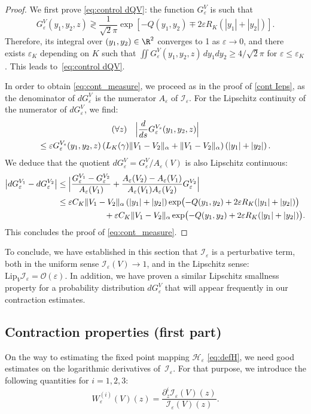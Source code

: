 \documentclass[JEP,XML,SOM,Unicode]{cedram}
\let\mathcal\mathscr
\newcommand{\cI}{\mathcal{I}}
\newcommand{\cO}{\mathcal{O}}
\theoremstyle{plain}
\theoremstyle{definition}
\renewcommand{\H}{\mathcal{H}_\eps}
\let\eps\varepsilon
\newcommand{\abs}[1]{\left\lvert#1\right\rvert}
\newcommand{\Babs}[1]{\Bigl\lvert#1\Bigr\rvert}
\newcommand{\QV}{G_\eps^V}
\newcommand{\dQVA}{dG_\eps^{V_1}}
\newcommand{\dQVB}{dG_\eps^{V_2}}
\newcommand{\Cgamma}{L_K(\gamma)}
\begin{document}
\begin{proof}
We first prove \eqref{eq:control dQV}: the function $\QV$ is such that
\begin{equation*}
\QV(y_1,y_2,z) \gtrless \dfrac1{\sqrt{2}\pi} \exp\left[-Q(y_1,y_2) \mp 2 \eps R_K (\abs{y_1}+\abs{y_2}) \right].
\end{equation*}
Therefore, its integral over $(y_1,y_2)\in \R^2$ converges to 1 as $\eps\to 0$, and there exists $\eps_K$ depending on $K$ such that $\iint \QV(y_1,y_2,z)\,dy_1 dy_2 \geq 4/{\sqrt{2}\pi}$ for $\eps \leq \eps_K$. This leads to~\eqref{eq:control dQV}.

In order to obtain \eqref{eq:cont_measure}, we proceed as in the proof of \cref{cont Ieps}, as the denominator of $d\QV$ is the numerator $A_\eps$ of $\cI_\eps$. For the Lipschitz continuity of the numerator of $d\QV$, we find:
\begin{multline*}
(\forall z)\quad \Bigl | \dfrac{d}{ds} G_\eps^{V_s}(y_1,y_2,z) \Bigr |\\ \leq \eps G_\eps^{V_s} (y_1,y_2, z) \left (\Cgamma \| V_1 - V_2\|_\alpha + \| V_1 - V_2\|_\alpha \right) \left (|y_1| + |y_2|\right).
\end{multline*}
We deduce that the quotient $d\QV =\QV/{A_\eps(V)}$ is also Lipschitz continuous:
\begin{align*}
\abs{\dQVA - \dQVB} &\leq \Babs{\dfrac{G_\eps^{V_1} - G_\eps^{V_2}}{A_\eps(V_1)} + \dfrac{A_\eps(V_2) - A_\eps(V_1)}{A_\eps(V_1)A_\eps(V_2)} G_\eps^{V_2}}\\
& \leq \eps C_K\| V_1 - V_2\|_\alpha \left (|y_1| + |y_2|\right) \exp \bigl(-Q(y_1,y_2) + 2 \eps R_K(\abs{y_1}+\abs{y_2}) \bigr)\\
& \hspace*{2cm} + \eps C_K \| V_1 - V_2\|_\alpha \exp \bigl(-Q(y_1,y_2) + 2 \eps R_K (\abs{y_1}+\abs{y_2}) \bigr).
\end{align*}
This concludes the proof of \eqref{eq:cont_measure}.
\end{proof}

To conclude, we have established in this section that $\cI_\eps$ is a perturbative term, both in the uniform sense $\cI_\eps (V) \to 1$, and in the Lipschitz sense: $\mathrm{Lip}_V \cI_\eps = \cO(\eps)$. In addition, we have proven a similar Lipschitz smallness property for a probability distribution $d\QV$ that will appear frequently in our contraction estimates.

\subsection{Contraction properties (first part)}\label{sec a priori estimates}
On the way to estimating the fixed point mapping $\H$ \eqref{eq:defH}, we need good estimates on the logarithmic derivatives of~$\cI_\eps$. For that purpose, we introduce the following quantities for $i =1,2,3$:
\begin{equation}\label{def:W}
W^{(i)}_\eps (V) (z)= \dfrac{\partial_z^i \cI_\eps(V)(z)}{\cI_\eps(V)(z)}.
\end{equation}
\end{document}
